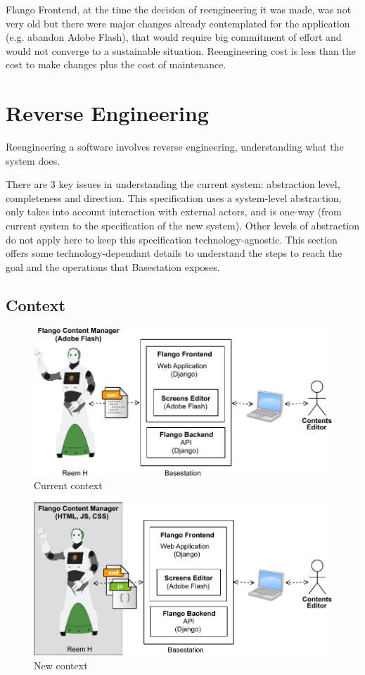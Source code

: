 Flango Frontend, at the time the decision of reengineering it was made, was not very old but there were major changes already contemplated for the application (e.g. abandon Adobe Flash), that would require big commitment of effort and would not converge to a sustainable situation.
Reengineering cost is less than the cost to make changes plus the cost of maintenance.


\section{Reverse Engineering}
\label{sec:context}
Reengineering a software involves reverse engineering, understanding what the system does.

There are 3 key issues in understanding the current system: abstraction level, completeness and direction.
This specification uses a system-level abstraction, only takes into account interaction with external actors, and is one-way (from current system to the specification of the new system).
Other levels of abstraction do not apply here to keep this specification technology-agnostic.
This section offers some technology-dependant details to understand the steps to reach the goal and the operations that Basestation exposes.

\subsection{Context}
\begin{figure}[htb]
    \centering
    \includegraphics[width=\textwidth]{figures/context-original}
    \caption{Current context}
    \label{fig:context-original}
\end{figure}

\begin{figure}[htb]
    \centering
    \includegraphics[width=\textwidth]{figures/context-new}
    \caption{New context}
    \label{fig:context-new}
\end{figure}

